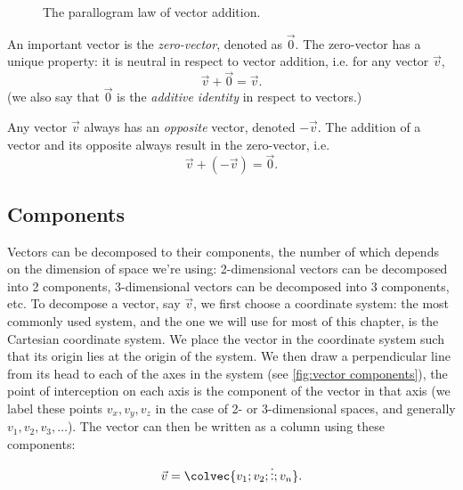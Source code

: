 \begin{figure}[h]
	\centering
	\caption{The parallogram law of vector addition.}
	\label{fig:parallelogram}
\end{figure}

An important vector is the \emph{zero-vector}, denoted as $\vec{0}$. The zero-vector has a unique property: it is neutral in respect to vector addition, i.e. for any vector $\vec{v}$,
\begin{equation}
	\vec{v} + \vec{0} = \vec{v}.
	\label{eq:zero-vector}
\end{equation}
(we also say that $\vec{0}$ is the \emph{additive identity} in respect to vectors.)

Any vector $\vec{v}$ always has an \emph{opposite} vector, denoted $-\vec{v}$. The addition of a vector and its opposite always result in the zero-vector, i.e.
\begin{equation}
	\vec{v} + \left( -\vec{v} \right) = \vec{0}.
	\label{eq:opposite vector}
\end{equation}

\subsection{Components}
Vectors can be decomposed to their components, the number of which depends on the dimension of space we're using: 2-dimensional vectors can be decomposed into 2 components, 3-dimensional vectors can be decomposed into 3 components, etc. To decompose a vector, say $\vec{v}$, we first choose a coordinate system: the most commonly used system, and the one we will use for most of this chapter, is the Cartesian coordinate system. We place the vector in the coordinate system such that its origin lies at the origin of the system. We then draw a perpendicular line from its head to each of the axes in the system (see \autoref{fig:vector components}), the point of interception on each axis is the component of the vector in that axis (we label these points $v_{x},v_{y},v_{z}$ in the case of 2- or 3-dimensional spaces, and generally $v_{1},v_{2},v_{3},\dots$). The vector can then be written as a column using these components:
\begin{equation}
	\vec{v} = \colvec{v_{1};v_{2};\vdots;v_{n}}.
	\label{eq:column vector}
\end{equation}


